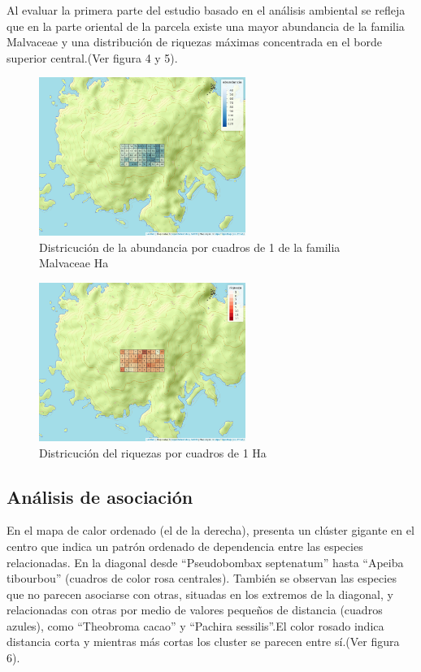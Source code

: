 \documentclass[11pt,]{article}
\begin{document}
Al evaluar la primera parte del estudio basado en el análisis ambiental
se refleja que en la parte oriental de la parcela existe una mayor
abundancia de la familia Malvaceae y una distribución de riquezas
máximas concentrada en el borde superior central.(Ver figura 4 y 5).

\begin{figure}
\centering
\includegraphics[width=0.60000\textwidth]{mapa_cuadros_abun_mi_familia.png}
\caption{Districución de la abundancia por cuadros de 1 de la familia
Malvaceae Ha}
\end{figure}

\begin{figure}
\centering
\includegraphics[width=0.60000\textwidth]{mapa_cuadros_riq_mi_familia.png}
\caption{Districución del riquezas por cuadros de 1 Ha}
\end{figure}

\subsection{Análisis de asociación}\label{anuxe1lisis-de-asociaciuxf3n}

En el mapa de calor ordenado (el de la derecha), presenta un clúster
gigante en el centro que indica un patrón ordenado de dependencia entre
las especies relacionadas. En la diagonal desde ``Pseudobombax
septenatum'' hasta ``Apeiba tibourbou'' (cuadros de color rosa
centrales). También se observan las especies que no parecen asociarse
con otras, situadas en los extremos de la diagonal, y relacionadas con
otras por medio de valores pequeños de distancia (cuadros azules), como
``Theobroma cacao'' y ``Pachira sessilis''.El color rosado indica
distancia corta y mientras más cortas los cluster se parecen entre
sí.(Ver figura 6).
\end{document}
